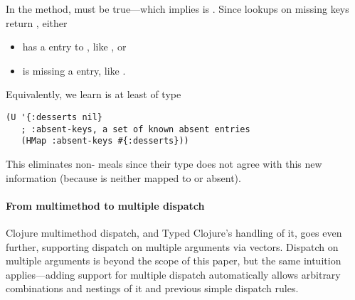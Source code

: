 In the  method,
must be true---which implies  is .
%
Since lookups on missing keys return , either
\begin{itemize}
  \item {} has a  entry to , like , or
  \item {} is missing a  entry, like \clj{{}}.
\end{itemize}
Equivalently, we learn  is at least of type
\begin{verbatim}
(U '{:desserts nil}
   ; :absent-keys, a set of known absent entries
   (HMap :absent-keys #{:desserts}))
\end{verbatim}
This eliminates non- meals
since their  type does not agree
with this new information (because 
is neither mapped to  or absent).


\paragraph{From multimethod to multiple dispatch}
Clojure multimethod dispatch, and Typed Clojure's handling of it, goes
even further, supporting dispatch on multiple arguments via vectors.
%
Dispatch on multiple arguments is beyond the scope of this paper,
but the same intuition applies---adding support for multiple dispatch
automatically allows arbitrary combinations and nestings
of it and previous simple dispatch rules.

%
%

